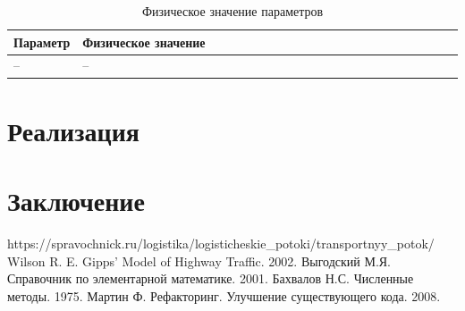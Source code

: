 \documentclass[12pt, a4paper]{extarticle}
\numberwithin{equation}{section}
\begin{document}
\begin{table}[h]
	\caption{Физическое значение параметров}
	\label{parameters}
	\begin{center}
		\begin{tabularx}{\textwidth}{p{0.15\linewidth}p{0.85\linewidth}}
			
			\hline
			\rule{0cm}{0,5cm}
			Параметр &  Физическое значение \\ 
			[3pt]\hline
			-- & -- \\
			\hline
		\end{tabularx}
	\end{center}
\end{table}

 
\section{Реализация} 
 

\newpage
\section*{Заключение}

\newpage

\begin{thebibliography}{**}
	https://spravochnick.ru/logistika/logisticheskie\_potoki/transportnyy\_potok/
	Wilson R. E. Gipps’ Model of Highway Traffic. 2002.
	Выгодский М.Я. Справочник по элементарной математике. 2001.
	 Бахвалов Н.С.  Численные методы. 1975.  
	Мартин Ф. Рефакторинг. Улучшение существующего кода. 2008.
\end{thebibliography}
\end{document}
